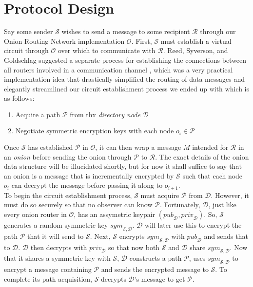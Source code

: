 \documentclass[10pt]{report}
\begin{document}
\section{Protocol Design}
Say some sender $\mathcal{S}$ wishes to send a message to some recipient $\mathcal{R}$
through our Onion Routing Network implementation $\mathcal{O}$.  First, $\mathcal{S}$
must establish a virtual circuit through $\mathcal{O}$ over which to communicate with
$\mathcal{R}$.  Reed, Syverson, and Goldschlag suggested a separate process for
establishing the connections between all routers involved in a communication channel
\cite{OnionRoutingPatent,HidingRoutingInformation}, which was a very practical implementation
idea that drastically simplified the routing of data messages and elegantly streamlined our
circuit establishment process we ended up with which is as follows:
\begin{enumerate}
    \item Acquire a path $\mathcal{P}$ from thx \textit{directory node} $\mathcal{D}$
    \item Negotiate symmetric encryption keys with each node $o_i \in \mathcal{P}$
\end{enumerate}
Once $\mathcal{S}$ has established $\mathcal{P}$ in $\mathcal{O}$, it can then wrap a message $M$
intended for $\mathcal{R}$ in an \textit{onion} before sending the onion through $\mathcal{P}$ to
$\mathcal{R}$.  The exact details of the onion data structure will be illucidated shortly, but for
now it shall suffice to say that an onion is a message that is incrementally encrypted by $\mathcal{S}$
such that each node $o_i$ can decrypt the message before passing it along to $o_{i+1}$.\\

To begin the circuit establishment process, $\mathcal{S}$ must acquire $\mathcal{P}$ from
$\mathcal{D}$.  However, it must do so securely so that no observer can know $\mathcal{P}$.
Fortunately, $\mathcal{D}$, just like every onion router in $\mathcal{O}$, has an assymetric
keypair $(\mathit{pub}_\mathcal{D}, \mathit{priv}_\mathcal{D})$.  So, $\mathcal{S}$ generates a
random symmetric key $\mathit{sym}_{\mathcal{S},\mathcal{D}}$.  $\mathcal{D}$ will later use this to encrypt
the path $\mathcal{P}$ that it will send to $\mathcal{S}$.  Next, $\mathcal{S}$ encrypts
$\mathit{sym}_{\mathcal{S},\mathcal{D}}$ with $\mathit{pub}_\mathcal{D}$ and sends that to
$\mathcal{D}$.  $\mathcal{D}$ then decrypts with $\mathit{priv}_\mathcal{D}$ so that now both
$\mathcal{S}$ and $\mathcal{D}$ share $\mathit{sym}_{\mathcal{S},\mathcal{D}}$.  Now that it shares
a symmetric key with $\mathcal{S}$, $\mathcal{D}$ constructs a path $\mathcal{P}$, uses
$\mathit{sym}_{\mathcal{S},\mathcal{D}}$ to encrypt a message containing $\mathcal{P}$ and sends
the encrypted message to $\mathcal{S}$.  To complete its path acquisition, $\mathcal{S}$ decrypts
$\mathcal{D}$'s message to get $\mathcal{P}$.\\
\end{document}
